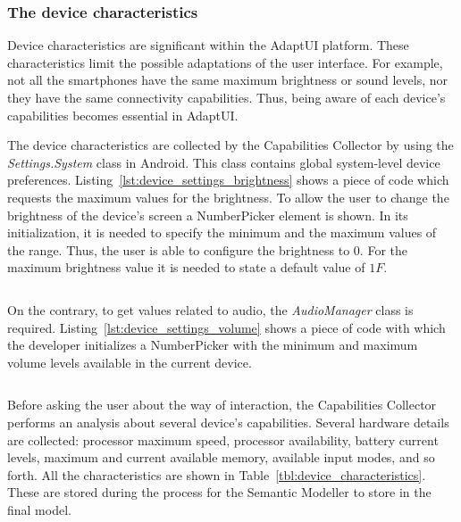 \subsubsection{The device characteristics}
\label{sec:device_characteristics}

Device characteristics are significant within the AdaptUI platform. These
characteristics limit the possible adaptations of the user interface. For example,
not all the smartphones have the same maximum brightness or sound levels, nor
they have the same connectivity capabilities. Thus, being aware of each device's
capabilities becomes essential in AdaptUI.

The device characteristics are collected by the Capabilities Collector by using
the \textit{Settings.System} class in Android. This class contains global
system-level device preferences. Listing~\ref{lst:device_settings_brightness} 
shows a piece of code which requests the maximum values for the brightness. To 
allow the user to change the brightness of the device's screen a NumberPicker 
element is shown. In its initialization, it is needed to specify the minimum and 
the maximum values of the range. Thus, the user is able to configure the brightness 
to $0$. For the maximum brightness value it is needed to state a default value 
of $1F$.

\inputminted[linenos=true, fontsize=\footnotesize, frame=lines]{java}{4_system_architecture/device_settings_brightness.java}


On the contrary, to get values related to audio, the \textit{AudioManager} class
is required. Listing~\ref{lst:device_settings_volume} shows a piece of code with
which the developer initializes a NumberPicker with the minimum and maximum
volume levels available in the current device.

\inputminted[linenos=true, fontsize=\footnotesize, frame=lines]{java}{4_system_architecture/device_settings_volume.java}


Before asking the user about the way of interaction, the Capabilities Collector
performs an analysis about several device's capabilities. Several hardware
details are collected: processor maximum speed, processor availability, battery
current levels, maximum and current available memory, available input modes, 
and so forth. All the characteristics are shown in Table~\ref{tbl:device_characteristics}. 
These are stored during the process for the Semantic Modeller to store in the 
final model.

